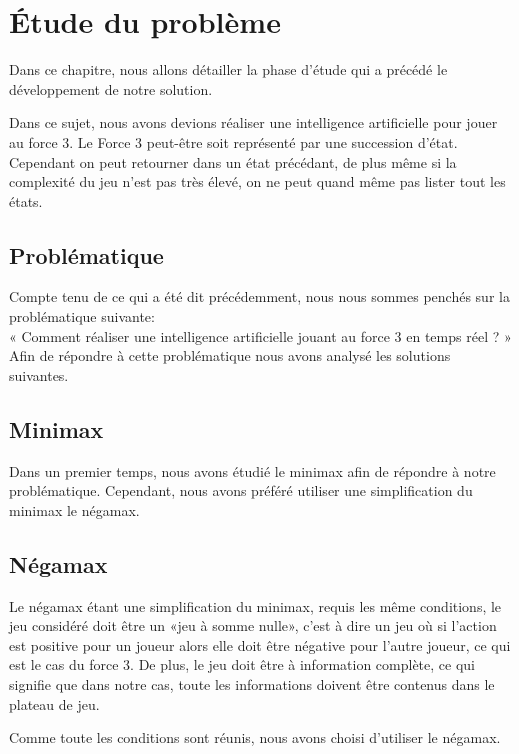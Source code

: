 \chapter{Étude du problème}

Dans ce chapitre, nous allons détailler la phase d'étude qui a précédé le
développement de notre solution.

Dans ce sujet, nous avons devions réaliser une intelligence artificielle pour
jouer au force 3.
Le Force 3 peut-être soit représenté par une succession d'état. Cependant on
peut retourner dans un état précédant, de plus même si la complexité du jeu
n'est pas très élevé, on ne peut quand même pas lister tout les états.

\section{Problématique}

Compte tenu de ce qui a été dit précédemment, nous nous sommes penchés sur la
problématique suivante: \\
« Comment réaliser une intelligence artificielle jouant au force 3 en temps
réel ? » \\
Afin de répondre à cette problématique nous avons analysé les solutions
suivantes.

\section{Minimax}

Dans un premier temps, nous avons étudié le minimax afin de répondre à notre
problématique.
Cependant, nous avons préféré utiliser une simplification du minimax le négamax.

\section{Négamax}

Le négamax étant une simplification du minimax, requis les même conditions,
le jeu considéré doit être un «jeu à somme nulle», c'est à dire un jeu où si
l'action est positive pour un joueur alors elle doit être négative pour l'autre
joueur, ce qui est le cas du force 3. De plus, le jeu doit être à information
complète, ce qui signifie que dans notre cas, toute les informations doivent
être contenus dans le plateau de jeu.

Comme toute les conditions sont réunis, nous avons choisi d'utiliser le négamax.

